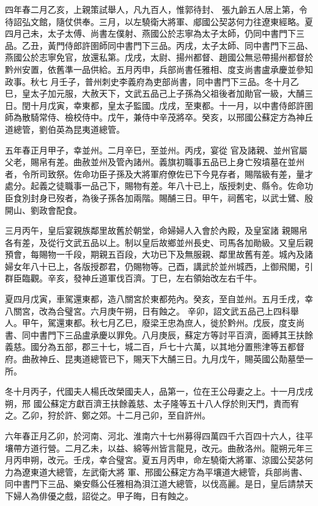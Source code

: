\begin{pinyinscope}
 四年春二月乙亥，上親策試舉人，凡九百人，惟郭待封、
 張九齡五人居上第，令待詔弘文館，隨仗供奉。三月，以左驍衛大將軍、郕國公契苾何力往遼東經略。夏四月己未，太子太傅、尚書左僕射、燕國公於志寧為太子太師，仍同中書門下三品。乙丑，黃門侍郎許圉師同中書門下三品。丙戌，太子太師、同中書門下三品、燕國公於志寧免官，放還私第。戊戌，太尉、揚州都督、趙國公無忌帶揚州都督於黔州安置，依舊準一品供給。五月丙申，兵部尚書任雅相、度支尚書盧承慶並參知政事。秋七
 月壬子，普州刺史李義府為吏部尚書，同中書門下三品。冬十月乙巳，皇太子加元服，大赦天下，文武五品己上子孫為父祖後者加勛官一級，大酺三日。閏十月戊寅，幸東都，皇太子監國。戊戌，至東都。十一月，以中書侍郎許圉師為散騎常侍、檢校侍中。戊午，兼侍中辛茂將卒。癸亥，以邢國公蘇定方為神丘道總管，劉伯英為昆夷道總管。



 五年春正月甲子，幸並州。二月辛巳，至並州。丙戌，宴從
 官及諸親、並州官屬父老，賜帛有差。曲赦並州及管內諸州。義旗初職事五品已上身亡歿墳墓在並州者，令所司致祭。佐命功臣子孫及大將軍府僚佐已下今見存者，賜階級有差，量才處分。起義之徒職事一品己下，賜物有差。年八十已上，版授刺史、縣令。佐命功臣食別封身已歿者，為後子孫各加兩階。賜酺三日。甲午，祠舊宅，以武士鷿、殷開山、劉政會配食。



 三月丙午，皇后宴親族鄰里故舊於朝堂，命婦婦人入會於內殿，及皇室諸
 親賜帛各有差，及從行文武五品以上。制以皇后故鄉並州長史、司馬各加勛級。又皇后親預會，每賜物一千段，期親五百段，大功已下及無服親、鄰里故舊有差。城內及諸婦女年八十已上，各版授郡君，仍賜物等。己酉，講武於並州城西，上御飛閣，引群臣臨觀。辛亥，發神丘道軍伐百濟。丁巳，左右領始改左右千牛。



 夏四月戊寅，車駕還東都，造八關宮於東都苑內。癸亥，至自並州。五月壬戌，幸八關宮，改為合璧宮。六月庚午朔，日有蝕之。
 辛卯，詔文武五品己上四科舉人。甲午，駕還東都。秋七月乙巳，廢梁王忠為庶人，徙於黔州。戊辰，度支尚書、同中書門下三品盧承慶以罪免。八月庚辰，蘇定方等討平百濟，面縛其王扶餘義慈。國分為五部，郡三十七，城二百，戶七十六萬，以其地分置熊津等五都督府。曲赦神丘、昆夷道總管已下，賜天下大酺三日。九月戊午，賜英國公勣墓塋一所。



 冬十月丙子，代國夫人楊氏改榮國夫人，品第一，位在王公母妻之上。十一月戊戌朔，邢
 國公蘇定方獻百濟王扶餘義慈、太子隆等五十八人俘於則天門，責而宥之。乙卯，狩於許、鄭之郊。十二月己卯，至自許州。



 六年春正月乙卯，於河南、河北、淮南六十七州募得四萬四千六百四十六人，往平壤帶方道行營。二月乙未，以益、綿等州皆言龍見，改元。曲赦洛州。龍朔元年三月丙申朔，改元。壬戌，幸合璧宮。夏五月丙申，命左驍衛大將軍、涼國公契苾何力為遼東道大總管，左武衛大將
 軍、邢國公蘇定方為平壤道大總管，兵部尚書、同中書門下三品、樂安縣公任雅相為浿江道大總管，以伐高麗。是日，皇后請禁天下婦人為俳優之戲，詔從之。甲子晦，日有蝕之。




\end{pinyinscope}

